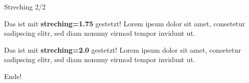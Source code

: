 \documentclass[
  ignorenonframetext,
]{beamer}
\begin{document}
\begin{frame}{Streching 2/2}
\protect\hypertarget{streching-22}{}
{

Das ist mit \textbf{streching=1.75} gestetzt! Lorem ipsum dolor sit
amet, consetetur sadipscing elitr, sed diam nonumy eirmod tempor
invidunt ut.

}

{

Das ist mit \textbf{streching=2.0} gestetzt! Lorem ipsum dolor sit amet,
consetetur sadipscing elitr, sed diam nonumy eirmod tempor invidunt ut.

}
\end{frame}

\begin{frame}{Ende!}
\protect\hypertarget{ende}{}
\end{frame}
\end{document}
